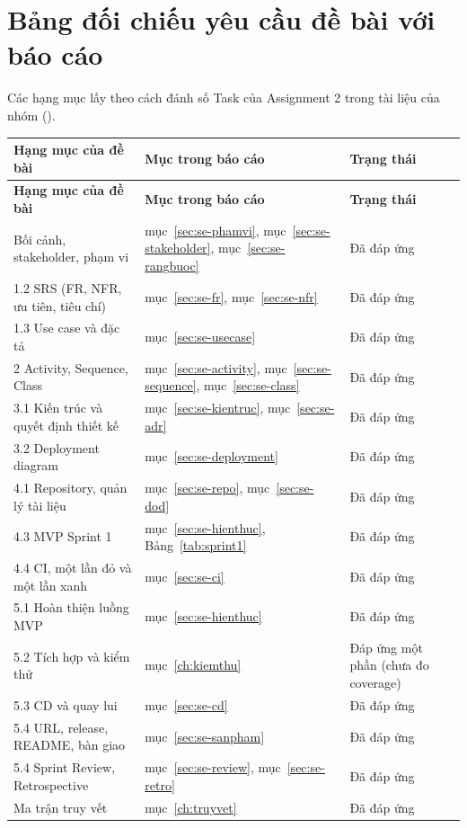 \documentclass[a4paper]{article}
\begin{document}
\section{Bảng đối chiếu yêu cầu đề bài với báo cáo}\label{app:doichieu}
Các hạng mục lấy theo cách đánh số Task của Assignment 2 trong tài liệu của nhóm ().
\begin{longtable}{@{}p{5.59cm}p{4.19cm}p{3.59cm}@{}}
\toprule
\textbf{Hạng mục của đề bài} & \textbf{Mục trong báo cáo} & \textbf{Trạng thái} \\ \midrule \endfirsthead
\toprule
\textbf{Hạng mục của đề bài} & \textbf{Mục trong báo cáo} & \textbf{Trạng thái} \\ \midrule \endhead
\bottomrule \endlastfoot
1.1 Bối cảnh, stakeholder, phạm vi & mục~\ref{sec:se-phamvi}, mục~\ref{sec:se-stakeholder}, mục~\ref{sec:se-rangbuoc} & Đã đáp ứng \\
1.2 SRS (FR, NFR, ưu tiên, tiêu chí) & mục~\ref{sec:se-fr}, mục~\ref{sec:se-nfr} & Đã đáp ứng \\
1.3 Use case và đặc tả & mục~\ref{sec:se-usecase} & Đã đáp ứng \\
2 Activity, Sequence, Class & mục~\ref{sec:se-activity}, mục~\ref{sec:se-sequence}, mục~\ref{sec:se-class} & Đã đáp ứng \\
3.1 Kiến trúc và quyết định thiết kế & mục~\ref{sec:se-kientruc}, mục~\ref{sec:se-adr} & Đã đáp ứng \\
3.2 Deployment diagram & mục~\ref{sec:se-deployment} & Đã đáp ứng \\
4.1 Repository, quản lý tài liệu & mục~\ref{sec:se-repo}, mục~\ref{sec:se-dod} & Đã đáp ứng \\
4.3 MVP Sprint 1 & mục~\ref{sec:se-hienthuc}, Bảng~\ref{tab:sprint1} & Đã đáp ứng \\
4.4 CI, một lần đỏ và một lần xanh & mục~\ref{sec:se-ci} & Đã đáp ứng \\
5.1 Hoàn thiện luồng MVP & mục~\ref{sec:se-hienthuc} & Đã đáp ứng \\
5.2 Tích hợp và kiểm thử & mục~\ref{ch:kiemthu} & Đáp ứng một phần (chưa đo coverage) \\
5.3 CD và quay lui & mục~\ref{sec:se-cd} & Đã đáp ứng \\
5.4 URL, release, README, bàn giao & mục~\ref{sec:se-sanpham} & Đã đáp ứng \\
5.4 Sprint Review, Retrospective & mục~\ref{sec:se-review}, mục~\ref{sec:se-retro} & Đã đáp ứng \\
Ma trận truy vết & mục~\ref{ch:truyvet} & Đã đáp ứng \\
\end{longtable}
\end{document}
